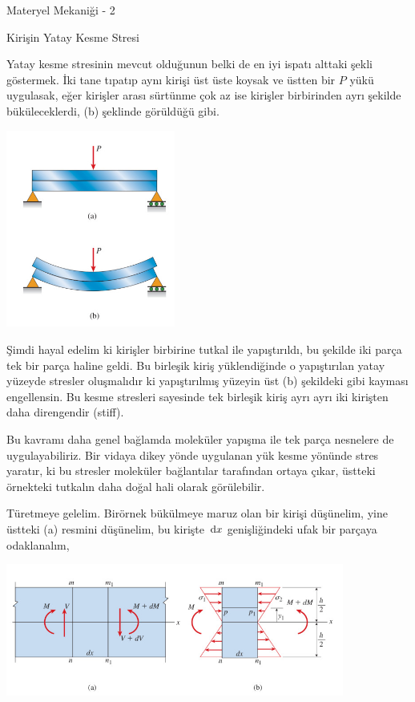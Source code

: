 \documentclass[12pt,fleqn]{article}\usepackage{../../common}
\begin{document}
Materyel Mekaniği - 2

Kirişin Yatay Kesme Stresi

Yatay kesme stresinin mevcut olduğunun belki de en iyi ispatı alttaki şekli
göstermek. İki tane tıpatıp aynı kirişi üst üste koysak ve üstten bir $P$ yükü
uygulasak, eğer kirişler arası sürtünme çok az ise kirişler birbirinden ayrı
şekilde büküleceklerdi, (b) şeklinde görüldüğü gibi.

\includegraphics[width=15em]{phy_020_strs_02_02.jpg}

Şimdi hayal edelim ki kirişler birbirine tutkal ile yapıştırıldı, bu şekilde iki
parça tek bir parça haline geldi. Bu birleşik kiriş yüklendiğinde o yapıştırılan
yatay yüzeyde stresler oluşmalıdır ki yapıştırılmış yüzeyin üst (b) şekildeki
gibi kayması engellensin. Bu kesme stresleri sayesinde tek birleşik kiriş ayrı
ayrı iki kirişten daha direngendir (stiff).

Bu kavramı daha genel bağlamda moleküler yapışma ile tek parça nesnelere de
uygulayabiliriz. Bir vidaya dikey yönde uygulanan yük kesme yönünde stres
yaratır, ki bu stresler moleküler bağlantılar tarafından ortaya çıkar, üstteki
örnekteki tutkalın daha doğal hali olarak görülebilir.

Türetmeye gelelim. Birörnek bükülmeye maruz olan bir kirişi düşünelim, yine
üstteki (a) resmini düşünelim, bu kirişte $\,\mathrm{d} x$ genişliğindeki ufak bir
parçaya odaklanalım,

\includegraphics[width=30em]{phy_020_strs_02_01.jpg}
\end{document}
